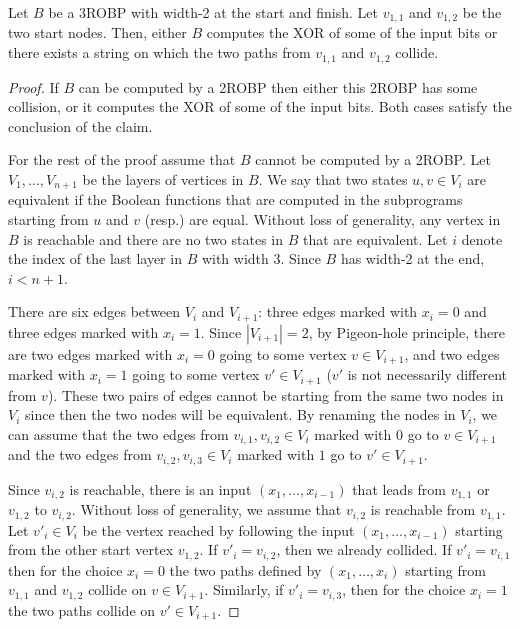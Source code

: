 \begin{claim}\label{claim:XOR or Colliding}
Let $B$ be a 3ROBP with width-2 at the start and finish. 
Let $v_{1,1}$ and $v_{1,2}$ be the two start nodes.
Then, either $B$ computes the XOR of some of the input bits or there exists a string on which the two paths from $v_{1,1}$ and $v_{1,2}$ collide.
\end{claim}
\begin{proof}
	If $B$ can be computed by a 2ROBP then either this 2ROBP has some collision, or it computes the XOR of some of the input bits. Both cases satisfy the conclusion of the claim.
		
	For the rest of the proof assume that $B$ cannot be computed by a 2ROBP.
	Let $V_1, \ldots, V_{n+1}$ be the layers of vertices in $B$.
	We say that two states $u,v \in V_i$ are equivalent if the Boolean functions that are computed in the subprograms starting from $u$ and $v$ (resp.) are equal.
	Without loss of generality, any vertex in $B$ is reachable and there are no two states in $B$ that are equivalent.
	Let $i$ denote the index of the last layer in $B$ with width $3$.
	Since $B$ has width-2 at the end, $i<n+1$.
	
	There are  six edges between $V_{i}$ and $V_{i+1}$: three edges marked with $x_{i}=0$ and three edges marked with $x_{i}=1$.
	Since $|V_{i+1}|=2$, by Pigeon-hole principle, there are two edges marked with $x_i = 0$ going to some vertex $v \in V_{i+1}$, and two edges marked with $x_i = 1$ going to some vertex $v'\in V_{i+1}$ ($v'$ is not necessarily different from $v$). 
	These two pairs of edges cannot be starting from the same two nodes in $V_{i}$ since then the two nodes will be equivalent. 
	By renaming the nodes in $V_i$, we can assume that the two edges from $v_{i,1}, v_{i,2} \in V_i$ marked with $0$ go to $v\in V_{i+1}$ 
	and the two edges from $v_{i,2}, v_{i,3}\in V_i$ marked with $1$ go to $v'\in V_{i+1}$. 
	
	Since $v_{i,2}$ is reachable, there is an input $(x_1, \ldots, x_{i-1})$ that leads from $v_{1,1}$ or $v_{1,2}$ to $v_{i,2}$.
	Without loss of generality, we assume that $v_{i,2}$ is reachable from  $v_{1,1}$.
	Let $v'_i \in V_i$ be the vertex reached by following the input $(x_1, \ldots, x_{i-1})$ starting from the other start vertex $v_{1,2}$.
	If $v'_i = v_{i,2}$, then we already collided. If $v'_i = v_{i,1}$ then for the choice $x_i = 0$ the two paths defined by $(x_1, \ldots, x_i)$  starting from $v_{1,1}$ and $v_{1,2}$ collide on $v \in V_{i+1}$.
	Similarly, if $v'_i = v_{i,3}$, then for the choice $x_i = 1$ the two paths collide on $v' \in V_{i+1}$.
	\end{proof}


